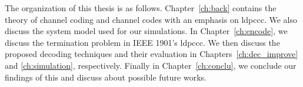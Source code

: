 The organization of this thesis is as follows. Chapter~\ref{ch:back} contains the theory of channel coding and channel codes with an emphasis on \gls{ldpccc}. We also discuss the system model used for our simulations. In Chapter~\ref{ch:encode}, we discuss the termination problem in IEEE 1901's \gls{ldpccc}. We then discuss the proposed decoding techniques and their evaluation in Chapters~\ref{ch:dec_improve} and \ref{ch:simulation}, respectively. Finally in Chapter~\ref{ch:conclu}, we conclude our findings of this and discuss about possible future works.